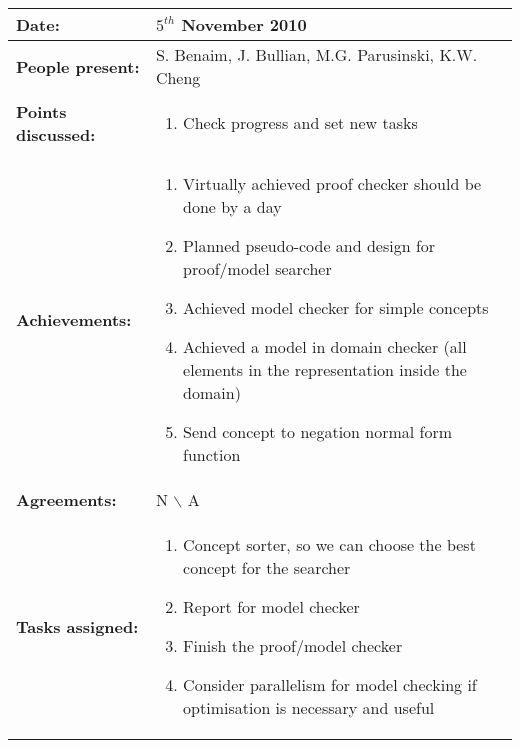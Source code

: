 \documentclass[12pt,a4paper]{article}
\newcommand{\meeting}[6]{%
\begin{center}%
\begin{longtable}{| p{3.5cm} | | p{13cm} |}%
\hline%
\textbf{Date:} & #1 \\%
\hline%
\textbf{People present:} &#2 \\%
\hline%
\textbf{Points discussed:} &#3\\%
\hline%
\textbf{Achievements:} &#4 \\%
\hline%
\textbf{Agreements:} &#5 \\%
\hline%
\textbf{Tasks assigned:} &#6  \\%
\hline%
\end{longtable}%
\end{center}%
\bigbreak
}
\begin{document}
\meeting{$5^{th}$ November 2010}%
{S. Benaim, J. Bullian, M.G. Parusinski, K.W. Cheng}%
{\begin{enumerate} 
\item  Check progress and set new tasks
\end{enumerate} }%
{\begin{enumerate}
\item Virtually achieved proof checker should be done by a day
\item Planned pseudo-code and design for proof/model searcher
\item Achieved model checker for simple concepts
\item Achieved a model in domain checker (all elements in the representation inside the domain)
\item Send concept to negation normal form function
\end{enumerate}}%
{N $\backslash$ A}
{\begin{enumerate}
\item Concept sorter, so we can choose the best concept for the searcher
\item Report for model checker
\item Finish the proof/model checker
\item Consider parallelism for model checking if optimisation is necessary and useful
\end{enumerate}}%
\end{document}
